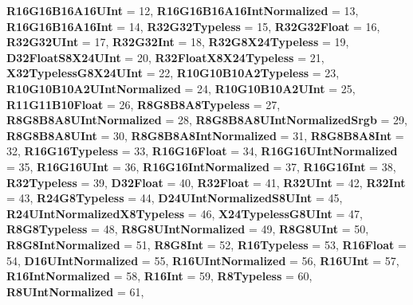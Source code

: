 \begin{DoxyCompactItemize}
{\bfseries R16\+G16\+B16\+A16\+U\+Int} = 12, 
{\bfseries R16\+G16\+B16\+A16\+Int\+Normalized} = 13, 
{\bfseries R16\+G16\+B16\+A16\+Int} = 14, 
\newline
{\bfseries R32\+G32\+Typeless} = 15, 
{\bfseries R32\+G32\+Float} = 16, 
{\bfseries R32\+G32\+U\+Int} = 17, 
{\bfseries R32\+G32\+Int} = 18, 
\newline
{\bfseries R32\+G8\+X24\+Typeless} = 19, 
{\bfseries D32\+Float\+S8\+X24\+U\+Int} = 20, 
{\bfseries R32\+Float\+X8\+X24\+Typeless} = 21, 
{\bfseries X32\+Typeless\+G8\+X24\+U\+Int} = 22, 
\newline
{\bfseries R10\+G10\+B10\+A2\+Typeless} = 23, 
{\bfseries R10\+G10\+B10\+A2\+U\+Int\+Normalized} = 24, 
{\bfseries R10\+G10\+B10\+A2\+U\+Int} = 25, 
{\bfseries R11\+G11\+B10\+Float} = 26, 
\newline
{\bfseries R8\+G8\+B8\+A8\+Typeless} = 27, 
{\bfseries R8\+G8\+B8\+A8\+U\+Int\+Normalized} = 28, 
{\bfseries R8\+G8\+B8\+A8\+U\+Int\+Normalized\+Srgb} = 29, 
{\bfseries R8\+G8\+B8\+A8\+U\+Int} = 30, 
\newline
{\bfseries R8\+G8\+B8\+A8\+Int\+Normalized} = 31, 
{\bfseries R8\+G8\+B8\+A8\+Int} = 32, 
{\bfseries R16\+G16\+Typeless} = 33, 
{\bfseries R16\+G16\+Float} = 34, 
\newline
{\bfseries R16\+G16\+U\+Int\+Normalized} = 35, 
{\bfseries R16\+G16\+U\+Int} = 36, 
{\bfseries R16\+G16\+Int\+Normalized} = 37, 
{\bfseries R16\+G16\+Int} = 38, 
\newline
{\bfseries R32\+Typeless} = 39, 
{\bfseries D32\+Float} = 40, 
{\bfseries R32\+Float} = 41, 
{\bfseries R32\+U\+Int} = 42, 
\newline
{\bfseries R32\+Int} = 43, 
{\bfseries R24\+G8\+Typeless} = 44, 
{\bfseries D24\+U\+Int\+Normalized\+S8\+U\+Int} = 45, 
{\bfseries R24\+U\+Int\+Normalized\+X8\+Typeless} = 46, 
\newline
{\bfseries X24\+Typeless\+G8\+U\+Int} = 47, 
{\bfseries R8\+G8\+Typeless} = 48, 
{\bfseries R8\+G8\+U\+Int\+Normalized} = 49, 
{\bfseries R8\+G8\+U\+Int} = 50, 
\newline
{\bfseries R8\+G8\+Int\+Normalized} = 51, 
{\bfseries R8\+G8\+Int} = 52, 
{\bfseries R16\+Typeless} = 53, 
{\bfseries R16\+Float} = 54, 
\newline
{\bfseries D16\+U\+Int\+Normalized} = 55, 
{\bfseries R16\+U\+Int\+Normalized} = 56, 
{\bfseries R16\+U\+Int} = 57, 
{\bfseries R16\+Int\+Normalized} = 58, 
\newline
{\bfseries R16\+Int} = 59, 
{\bfseries R8\+Typeless} = 60, 
{\bfseries R8\+U\+Int\+Normalized} = 61, 

\end{DoxyCompactItemize}
